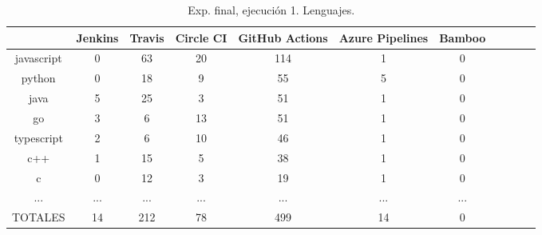\begin{table}[h]
  \centering
  \caption{Exp. final, ejecución 1. Lenguajes.}
  \label{tab:tabla_f2_2a}

\begin{footnotesize}
\renewcommand{\arraystretch}{1.5} %
\begin{tabular}{ccccccccccc}
  \hline
  {} &  Jenkins &  Travis &  Circle CI &  GitHub Actions &  Azure Pipelines &  Bamboo \\
  \hline
  javascript    &        0 &      63 &         20 &             114 &                1 &       0 \\
  python        &        0 &      18 &          9 &              55 &                5 &       0 \\
  java          &        5 &      25 &          3 &              51 &                1 &       0 \\
  go            &        3 &       6 &         13 &              51 &                1 &       0 \\
  typescript    &        2 &       6 &         10 &              46 &                1 &       0 \\
  c++           &        1 &      15 &          5 &              38 &                1 &       0 \\
  c             &        0 &      12 &          3 &              19 &                1 &       0 \\
  ...           &      ... &     ... &        ... &             ... &              ... &     ... \\
  TOTALES       &       14 &     212 &         78 &             499 &               14 &       0 \\
 \end{tabular}
\end{footnotesize}

\end{table}

